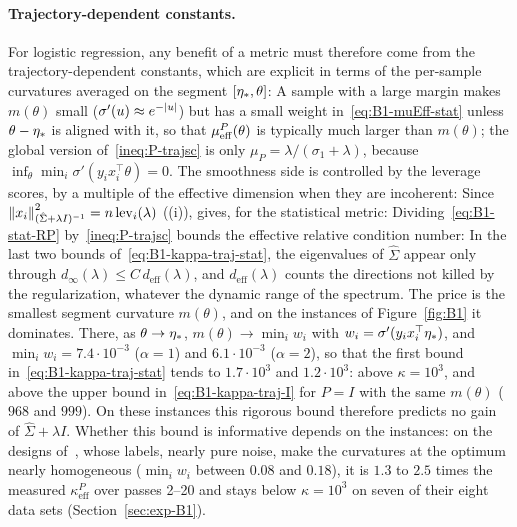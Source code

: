 \paragraph{Trajectory-dependent constants.}
For logistic regression, any benefit of a metric must therefore come from the trajectory-dependent constants, which are
explicit in terms of the per-sample curvatures averaged on the segment $[\eta_\ast,\theta]$:
A sample with a large margin makes $m(\theta)$ small ($\sigma'(u)\approx e^{-\left|u\right|}$) but has a small weight
in~\eqref{eq:B1-muEff-stat} unless $\theta-\eta_\ast$ is aligned with it, so that $\mu_{\mathrm{eff}}^P(\theta)$ is typically much
larger than $m(\theta)$; the global version of~\eqref{ineq:P-trajsc} is only $\mu_P=\lambda/(\sigma_1+\lambda)$, because
$\inf_\theta\min_i\sigma'(y_ix_i^\top\theta)=0$. The smoothness side is controlled by the leverage scores, by a
multiple of the effective dimension when they are incoherent:
Since $\left\|x_i\right\|_{(\hat\Sigma+\lambda I)^{-1}}^2=n\,\mathrm{lev}_i(\lambda)$ ((i)),
 gives, for the statistical metric:
Dividing~\eqref{eq:B1-stat-RP} by~\eqref{ineq:P-trajsc} bounds the effective relative condition number:
In the last two bounds of~\eqref{eq:B1-kappa-traj-stat}, the eigenvalues of $\hat\Sigma$ appear only through
$d_\infty(\lambda)\le C\,d_{\mathrm{eff}}(\lambda)$, and $d_{\mathrm{eff}}(\lambda)$ counts the directions not killed by
the regularization, whatever the dynamic range of the spectrum. The price is the smallest segment curvature
$m(\theta)$, and on the instances of Figure~\ref{fig:B1} it dominates. There, as $\theta\to\eta_\ast$,
$m(\theta)\to\min_iw_i$ with $w_i=\sigma'(y_ix_i^\top\eta_\ast)$, and $\min_iw_i=7.4\cdot10^{-3}$ ($\alpha=1$) and
$6.1\cdot10^{-3}$ ($\alpha=2$), so that the first bound in~\eqref{eq:B1-kappa-traj-stat} tends to $1.7\cdot10^3$ and
$1.2\cdot10^3$: above $\kappa=10^3$, and above the upper bound in~\eqref{eq:B1-kappa-traj-I} for $P=I$ with the same
$m(\theta)$ ($968$ and $999$). On these instances this rigorous bound therefore predicts no gain of
$\hat\Sigma+\lambda I$.
Whether this bound is informative depends on the instances: on the designs of~\cite{na2023hessian}, whose labels, nearly
pure noise, make the curvatures at the optimum nearly homogeneous ($\min_iw_i$ between $0.08$ and $0.18$), it is $1.3$
to $2.5$ times the measured $\kappa^P_{\mathrm{eff}}$ over passes 2--20 and stays below $\kappa=10^3$ on seven of their
eight data sets (Section~\ref{sec:exp-B1}).


